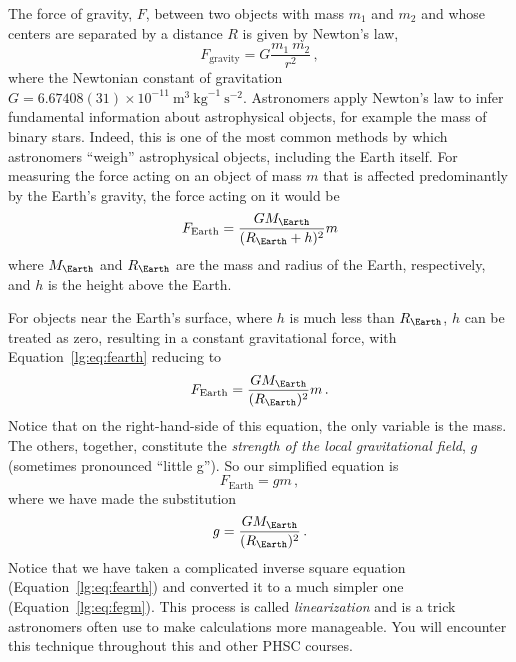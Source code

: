 The force of gravity, $F$, between two objects with mass $m_1$ and $m_2$ and whose centers are separated by a distance $R$ is given by Newton's law,
\begin{equation}\label{lg:eq:newtons}
 F_\textrm{gravity} = G \frac{m_1 \: m_2}{r^2} \,,
\end{equation}
where the Newtonian constant of gravitation $G = 6.67408(31) \times 10^{-11} \: \textrm{m}^3 \: \textrm{kg}^{-1} \: \textrm{s}^{-2}$. Astronomers apply Newton's law to infer fundamental information about astrophysical objects, for example the mass of binary stars. Indeed, this is one of the most common methods by which astronomers ``weigh'' astrophysical objects, including the Earth itself. For measuring the force acting on an object of mass $m$ that is affected predominantly by the Earth's gravity, the force acting on it would be
\begin{equation}\label{lg:eq:fearth}
 F_\textrm{Earth} = \frac{G M_\Earth}{(R_\Earth + h)^2} m
\end{equation}
where $M_\Earth$ and $R_\Earth$ are the mass and radius of the Earth, respectively, and $h$ is the height above the Earth.

For objects near the Earth's surface, where $h$ is much less than $R_\Earth$, $h$ can be treated as zero, resulting in a constant gravitational force, with Equation~\ref{lg:eq:fearth} reducing to
\begin{equation}\label{lg:eq:fearthred}
F_\textrm{Earth} = \frac{G M_\Earth}{(R_\Earth)^2} m \,.
\end{equation}
Notice that on the right-hand-side of this equation, the only variable is the mass. The others, together, constitute the \textit{strength of the local gravitational field}, $g$ (sometimes pronounced ``little g''). So our simplified equation is
\begin{equation}\label{lg:eq:fegm}
 F_\textrm{Earth} = g m \,,
\end{equation}
where we have made the substitution
\begin{equation}\label{lg:eq:g}
g = \dfrac{G M_\Earth}{(R_\Earth)^2} \, .
\end{equation}
Notice that we have taken a complicated inverse square equation (Equation~\ref{lg:eq:fearth}) and
converted it to a much simpler one (Equation~\ref{lg:eq:fegm}). This process is called \textit{linearization} and is a
trick astronomers often use to make calculations more manageable. You will encounter
this technique throughout this and other PHSC courses.

